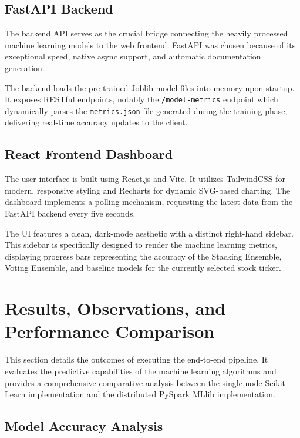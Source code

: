 \documentclass[12pt,a4paper]{report}
\begin{document}
\subsection{FastAPI Backend}

The backend API serves as the crucial bridge connecting the heavily processed machine learning models to the web frontend. FastAPI was chosen because of its exceptional speed, native async support, and automatic documentation generation.

The backend loads the pre-trained Joblib model files into memory upon startup. It exposes RESTful endpoints, notably the \texttt{/model-metrics} endpoint which dynamically parses the \texttt{metrics.json} file generated during the training phase, delivering real-time accuracy updates to the client.

\subsection{React Frontend Dashboard}

The user interface is built using React.js and Vite. It utilizes TailwindCSS for modern, responsive styling and Recharts for dynamic SVG-based charting. The dashboard implements a polling mechanism, requesting the latest data from the FastAPI backend every five seconds. 

The UI features a clean, dark-mode aesthetic with a distinct right-hand sidebar. This sidebar is specifically designed to render the machine learning metrics, displaying progress bars representing the accuracy of the Stacking Ensemble, Voting Ensemble, and baseline models for the currently selected stock ticker.

\clearpage

\section{Results, Observations, and Performance Comparison}

This section details the outcomes of executing the end-to-end pipeline. It evaluates the predictive capabilities of the machine learning algorithms and provides a comprehensive comparative analysis between the single-node Scikit-Learn implementation and the distributed PySpark MLlib implementation.



\subsection{Model Accuracy Analysis}
\end{document}
